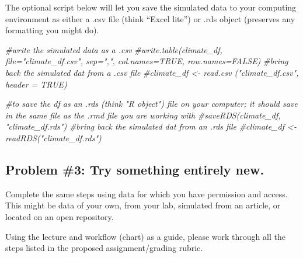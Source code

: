 \documentclass[
  english,
]{book}
\newenvironment{Shaded}{\begin{snugshade}}{\end{snugshade}}
\newcommand{\CommentTok}[1]{\textcolor[rgb]{0.56,0.35,0.01}{\textit{#1}}}
\begin{document}
The optional script below will let you save the simulated data to your computing environment as either a .csv file (think ``Excel lite'') or .rds object (preserves any formatting you might do).

\begin{Shaded}
\begin{Highlighting}[]
\CommentTok{#write the simulated data  as a .csv}
\CommentTok{#write.table(climate_df, file="climate_df.csv", sep=",", col.names=TRUE, row.names=FALSE)}
\CommentTok{#bring back the simulated dat from a .csv file}
\CommentTok{#climate_df <- read.csv ("climate_df.csv", header = TRUE)}
\end{Highlighting}
\end{Shaded}

\begin{Shaded}
\begin{Highlighting}[]
\CommentTok{#to save the df as an .rds (think "R object") file on your computer; it should save in the same file as the .rmd file you are working with}
\CommentTok{#saveRDS(climate_df, "climate_df.rds")}
\CommentTok{#bring back the simulated dat from an .rds file}
\CommentTok{#climate_df <- readRDS("climate_df.rds")}
\end{Highlighting}
\end{Shaded}

\hypertarget{problem-3-try-something-entirely-new.-2}{%
\subsection{Problem \#3: Try something entirely new.}\label{problem-3-try-something-entirely-new.-2}}

Complete the same steps using data for which you have permission and access. This might be data of your own, from your lab, simulated from an article, or located on an open repository.

Using the lecture and workflow (chart) as a guide, please work through all the steps listed in the proposed assignment/grading rubric.
\end{document}
